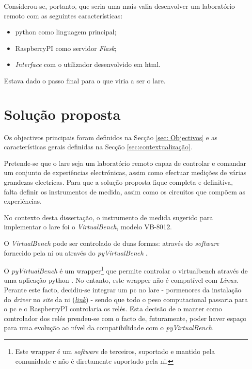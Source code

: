 Considerou-se, portanto, que seria uma mais-valia desenvolver um \acrshort{laboratório remoto} com as seguintes características:
\begin{itemize}
    \item \gls{python} como linguagem principal;
    \item \gls{RaspberryPI} como servidor \textit{Flask};
    \item \textit{Interface} com o utilizador desenvolvido em \acrshort{html}.
\end{itemize}

Estava dado o passo final para o que viria a ser o \acrshort{lare}.

\section{Solução proposta}
\label{sec:solucaoproposta}
Os objectivos principais foram definidos na Secção \ref{sec: Objectivos} e as características gerais definidas na Secção \ref{sec:contextualização}.

Pretende-se que o \acrshort{lare} seja um \acrshort{laboratório remoto} capaz de controlar e comandar um conjunto de experiências electrónicas, assim como efectuar medições de várias grandezas electricas. Para que a solução proposta fique completa e definitiva, falta definir os instrumentos de medida, assim como os circuitos que compõem as experiências.

No contexto desta dissertação, o instrumento de medida sugerido para implementar o \acrshort{lare} foi o \textit{VirtualBench}, modelo VB-8012.

O \textit{VirtualBench} pode ser controlado de duas formas: através do \textit{software} fornecido pela \acrshort{ni} ou através do \textit{pyVirtualBench} \cite{AutomatingVB}.

O \textit{pyVirtualBench} é um \gls{wrapper}\footnote{Este \gls{wrapper} é um \textit{software} de terceiros, suportado e mantido pela comunidade e não é diretamente suportado pela \acrshort{ni}.} que permite controlar o \acrshort{virtualbench} através de uma aplicação \gls{python} \cite{pyvirtualbench}. No entanto, este \gls{wrapper} não é compatível com \textit{Linux}.
Perante este facto, decidiu-se integrar um \acrshort{pc} no \acrshort{lare} - pormenores da instalação do \textit{driver} no \textit{site} da \acrshort{ni} (\href{https://knowledge.ni.com/KnowledgeArticleDetails?id=kA00Z000000kHUFSA2&l=pt-PT}{\textit{link}}) - sendo que todo o peso computacional passaria para o \acrshort{pc} e o \gls{RaspberryPI} controlaria os relés. Esta decisão de o manter como controlador dos relés prendeu-se com o facto de, futuramente, poder haver espaço para uma evolução ao nível da compatibilidade com o \textit{pyVirtualBench}.

